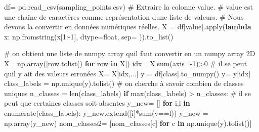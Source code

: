 \documentclass[
  french,
  11pt,
  letterpaper,
  open=any,
  twoside=false,
  french]{scrbook}
\newenvironment{Shaded}{\begin{snugshade}}{\end{snugshade}}
\newcommand{\BuiltInTok}[1]{\textcolor[rgb]{0.00,0.23,0.31}{#1}}
\newcommand{\CommentTok}[1]{\textcolor[rgb]{0.37,0.37,0.37}{#1}}
\newcommand{\ControlFlowTok}[1]{\textcolor[rgb]{0.00,0.23,0.31}{\textbf{#1}}}
\newcommand{\DecValTok}[1]{\textcolor[rgb]{0.68,0.00,0.00}{#1}}
\newcommand{\KeywordTok}[1]{\textcolor[rgb]{0.00,0.23,0.31}{\textbf{#1}}}
\newcommand{\NormalTok}[1]{\textcolor[rgb]{0.00,0.23,0.31}{#1}}
\newcommand{\OperatorTok}[1]{\textcolor[rgb]{0.37,0.37,0.37}{#1}}
\newcommand{\StringTok}[1]{\textcolor[rgb]{0.13,0.47,0.30}{#1}}
\begin{document}
\begin{Shaded}
\begin{Highlighting}[]
\NormalTok{df}\OperatorTok{=}\NormalTok{ pd.read\_csv(}\StringTok{\textquotesingle{}sampling\_points.csv\textquotesingle{}}\NormalTok{)}
\CommentTok{\# Extraire la colonne \textquotesingle{}value\textquotesingle{}.}
\CommentTok{\# \textquotesingle{}value\textquotesingle{} est une chaîne de caractères comme représentation d\textquotesingle{}une liste de valeurs.}
\CommentTok{\# Nous devons la convertir en données numériques réelles.}
\NormalTok{X }\OperatorTok{=}\NormalTok{ df[}\StringTok{\textquotesingle{}value\textquotesingle{}}\NormalTok{].}\BuiltInTok{apply}\NormalTok{(}\KeywordTok{lambda}\NormalTok{ x: np.fromstring(x[}\DecValTok{1}\NormalTok{:}\OperatorTok{{-}}\DecValTok{1}\NormalTok{], dtype}\OperatorTok{=}\BuiltInTok{float}\NormalTok{, sep}\OperatorTok{=}\StringTok{\textquotesingle{} \textquotesingle{}}\NormalTok{)).to\_list()}

\CommentTok{\# on obtient une liste de numpy array  qu\textquotesingle{}il faut convertir en un numpy array 2D}
\NormalTok{X}\OperatorTok{=}\NormalTok{ np.array([row.tolist() }\ControlFlowTok{for}\NormalTok{ row }\KeywordTok{in}\NormalTok{ X])}
\NormalTok{idx}\OperatorTok{=}\NormalTok{ X.}\BuiltInTok{sum}\NormalTok{(axis}\OperatorTok{={-}}\DecValTok{1}\NormalTok{)}\OperatorTok{\textgreater{}}\DecValTok{0} \CommentTok{\# il se peut qu\textquotesingle{}il y ait des valeurs erronées}
\NormalTok{X}\OperatorTok{=}\NormalTok{ X[idx,...]}
\NormalTok{y }\OperatorTok{=}\NormalTok{ df[}\StringTok{\textquotesingle{}class\textquotesingle{}}\NormalTok{].to\_numpy()}
\NormalTok{y}\OperatorTok{=}\NormalTok{ y[idx]}
\NormalTok{class\_labels }\OperatorTok{=}\NormalTok{ np.unique(y).tolist() }\CommentTok{\# on cherche à savoir combien de classes uniques}
\NormalTok{n\_classes }\OperatorTok{=} \BuiltInTok{len}\NormalTok{(class\_labels)}
\ControlFlowTok{if} \BuiltInTok{max}\NormalTok{(class\_labels) }\OperatorTok{\textgreater{}}\NormalTok{ n\_classes: }\CommentTok{\# il se peut que certaines classes soit absentes}
\NormalTok{  y\_new}\OperatorTok{=}\NormalTok{ []}
  \ControlFlowTok{for}\NormalTok{ i,l }\KeywordTok{in} \BuiltInTok{enumerate}\NormalTok{(class\_labels):}
\NormalTok{    y\_new.extend([i]}\OperatorTok{*}\BuiltInTok{sum}\NormalTok{(y}\OperatorTok{==}\NormalTok{l))}
\NormalTok{  y\_new }\OperatorTok{=}\NormalTok{ np.array(y\_new)}
\NormalTok{nom\_classes2}\OperatorTok{=}\NormalTok{ [nom\_classes[c] }\ControlFlowTok{for}\NormalTok{ c }\KeywordTok{in}\NormalTok{ np.unique(y).tolist()]}
\end{Highlighting}
\end{Shaded}
\end{document}

